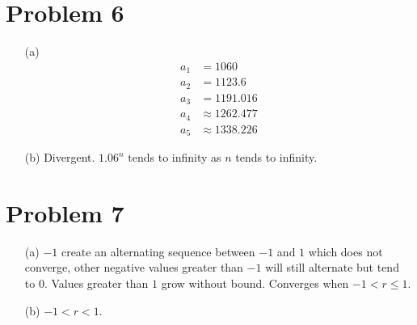 \documentclass[preview, margin=0.6in]{standalone}
\newcommand*{\problem}[1]{\section*{Problem #1}}
\begin{document}
\problem{6}
\begin{itemize}
	\item[(a)]
		\begin{align*}
			a_1&=1060 \\ 
			a_2&=1123.6 \\
			a_3&=1191.016 \\
			a_4&\approx1262.477 \\
			a_5&\approx1338.226
		\end{align*}

	\item[(b)]
		Divergent. $1.06^n$ tends to infinity as $n$ tends to infinity.
\end{itemize}

\problem{7}
\begin{itemize}
	\item[(a)]
		$-1$ create an alternating sequence between $-1$ and $1$ which does not converge, other negative values greater than $-1$ will still alternate but tend to $0$. Values greater than $1$ grow without bound. Converges when $-1<r\leq1$.
	\item[(b)]
		$-1<r<1$.
\end{itemize}
\end{document}

